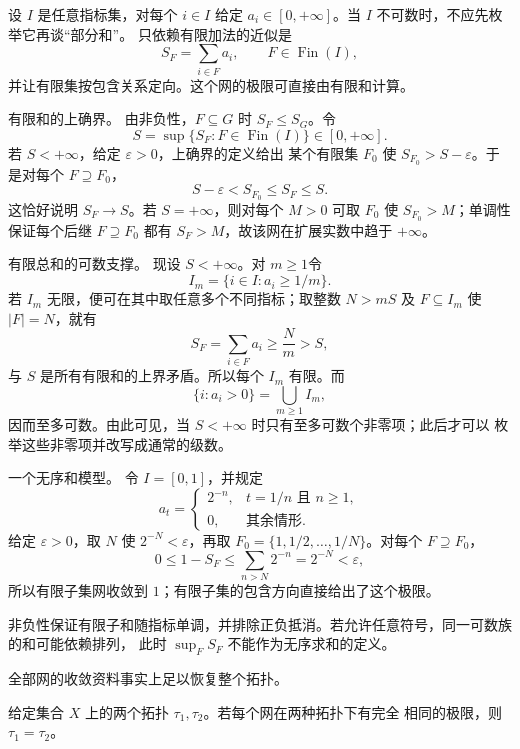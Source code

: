 \begin{example}[无序非负和的有限子集网]
\label{ch1:exa:worked-unordered-sums}
设 $I$ 是任意指标集，对每个 $i\in I$ 给定
$a_i\in[0,+\infty]$。当 $I$ 不可数时，不应先枚举它再谈“部分和”。
只依赖有限加法的近似是
\[
 S_F=\sum_{i\in F}a_i,
 \qquad F\in\operatorname{Fin}(I),
\]
并让有限集按包含关系定向。这个网的极限可直接由有限和计算。

\medskip
\noindent 有限和的上确界。
由非负性，$F\subseteq G$ 时 $S_F\leq S_G$。令
\[
 S=\sup\{S_F:F\in\operatorname{Fin}(I)\}\in[0,+\infty].
\]
若 $S<+\infty$，给定 $\varepsilon>0$，上确界的定义给出
某个有限集 $F_0$ 使 $S_{F_0}>S-\varepsilon$。于是对每个
$F\supseteq F_0$，
\[
 S-\varepsilon<S_{F_0}\leq S_F\leq S.
\]
这恰好说明 $S_F\to S$。若 $S=+\infty$，则对每个
$M>0$ 可取 $F_0$ 使 $S_{F_0}>M$；单调性保证每个后继
$F\supseteq F_0$ 都有 $S_F>M$，故该网在扩展实数中趋于
$+\infty$。

\medskip
\noindent 有限总和的可数支撑。
现设 $S<+\infty$。对 $m\geq1$令
\[
 I_m=\{i\in I:a_i\geq1/m\}.
\]
若 $I_m$ 无限，便可在其中取任意多个不同指标；取整数
$N>mS$ 及 $F\subseteq I_m$ 使 $|F|=N$，就有
\[
 S_F=\sum_{i\in F}a_i\geq\frac Nm>S,
\]
与 $S$ 是所有有限和的上界矛盾。所以每个 $I_m$ 有限。而
\[
 \{i:a_i>0\}=\bigcup_{m\geq1}I_m,
\]
因而至多可数。由此可见，当 $S<+\infty$ 时只有至多可数个非零项；此后才可以
枚举这些非零项并改写成通常的级数。

\medskip
\noindent 一个无序和模型。
令 $I=[0,1]$，并规定
\[
 a_t=
 \begin{cases}
 2^{-n},&t=1/n\text{ 且 }n\geq1,\\
 0,&\text{其余情形}.
 \end{cases}
\]
给定 $\varepsilon>0$，取 $N$ 使 $2^{-N}<\varepsilon$，再取
$F_0=\{1,1/2,\ldots,1/N\}$。对每个 $F\supseteq F_0$，
\[
 0\leq1-S_F
 \leq\sum_{n>N}2^{-n}=2^{-N}<\varepsilon,
\]
所以有限子集网收敛到 $1$；有限子集的包含方向直接给出了这个极限。

非负性保证有限子和随指标单调，并排除正负抵消。若允许任意符号，同一可数族的和可能依赖排列，
此时 $\sup_FS_F$ 不能作为无序求和的定义。
\end{example}

全部网的收敛资料事实上足以恢复整个拓扑。

\begin{proposition}[网收敛完全决定拓扑]
给定集合 \(X\) 上的两个拓扑 \(\tau_1,\tau_2\)。若每个网在两种拓扑下有完全
相同的极限，则 \(\tau_1=\tau_2\)。
\label{ch1:prop:nets-determine-topology}
\end{proposition}

